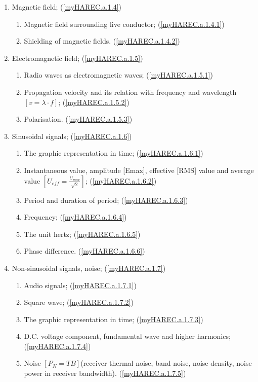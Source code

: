 \begin{enumerate}
\begin{enumerate}[noitemsep]
\item Magnetic field; (\ref{myHAREC.a.1.4})\label{HAREC.a.1.4}
\begin{enumerate}[noitemsep]
\item Magnetic field surrounding live conductor; (\ref{myHAREC.a.1.4.1})\label{HAREC.a.1.4.1}
\item Shielding of magnetic fields. (\ref{myHAREC.a.1.4.2})\label{HAREC.a.1.4.2}
\end{enumerate}

\item Electromagnetic field; (\ref{myHAREC.a.1.5})\label{HAREC.a.1.5}
\begin{enumerate}[noitemsep]
\item Radio waves as electromagnetic waves; (\ref{myHAREC.a.1.5.1})\label{HAREC.a.1.5.1}
\item Propagation velocity and its relation with frequency and wavelength $\left[v = \lambda \cdot f\right]$; (\ref{myHAREC.a.1.5.2})\label{HAREC.a.1.5.2}
\item Polarisation. (\ref{myHAREC.a.1.5.3})\label{HAREC.a.1.5.3}
\end{enumerate}

\item Sinusoidal signals; (\ref{myHAREC.a.1.6})\label{HAREC.a.1.6}
\begin{enumerate}[noitemsep]
\item The graphic representation in time; (\ref{myHAREC.a.1.6.1})\label{HAREC.a.1.6.1}
\item Instantaneous value, amplitude [Emax], effective [RMS] value and average value $\left[U_{eff} = \frac{U_{max}}{\sqrt{2}}\right]$; (\ref{myHAREC.a.1.6.2})\label{HAREC.a.1.6.2}
\item Period and duration of period; (\ref{myHAREC.a.1.6.3})\label{HAREC.a.1.6.3}
\item Frequency; (\ref{myHAREC.a.1.6.4})\label{HAREC.a.1.6.4}
\item The unit hertz; (\ref{myHAREC.a.1.6.5})\label{HAREC.a.1.6.5}
\item Phase difference. (\ref{myHAREC.a.1.6.6})\label{HAREC.a.1.6.6}
\end{enumerate}

\item Non-sinusoidal signals, noise; (\ref{myHAREC.a.1.7})\label{HAREC.a.1.7}
\begin{enumerate}[noitemsep]
\item Audio signals; (\ref{myHAREC.a.1.7.1})\label{HAREC.a.1.7.1}
\item Square wave; (\ref{myHAREC.a.1.7.2})\label{HAREC.a.1.7.2}
\item The graphic representation in time; (\ref{myHAREC.a.1.7.3})\label{HAREC.a.1.7.3}
\item D.C. voltage component, fundamental wave and higher harmonics; (\ref{myHAREC.a.1.7.4})\label{HAREC.a.1.7.4}
\item Noise $\left[P_N=TB\right]$(receiver thermal noise, band noise, noise density, noise power in receiver bandwidth).  (\ref{myHAREC.a.1.7.5})\label{HAREC.a.1.7.5}
\end{enumerate}


\end{enumerate}
\end{enumerate}
